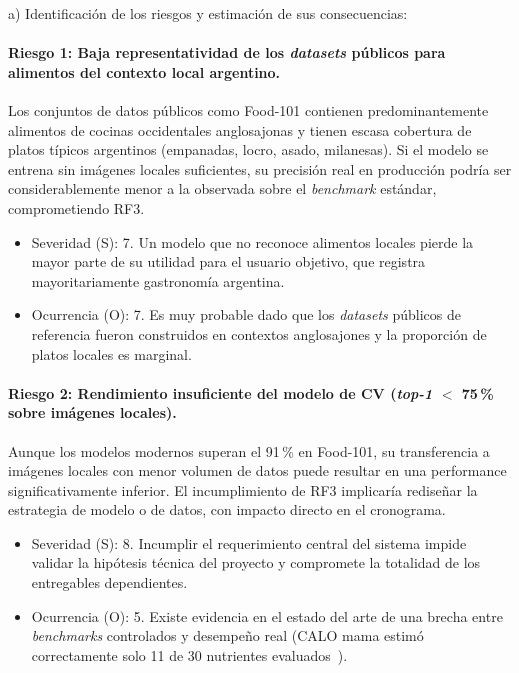 \documentclass[
11pt, %
]{charter}
\begin{document}
a) Identificación de los riesgos y estimación de sus consecuencias:

\paragraph{Riesgo 1: Baja representatividad de los \textit{datasets} públicos para alimentos del contexto local argentino.}
Los conjuntos de datos públicos como Food-101 contienen predominantemente alimentos de cocinas occidentales anglosajonas y tienen escasa cobertura de platos típicos argentinos (empanadas, locro, asado, milanesas). Si el modelo se entrena sin imágenes locales suficientes, su precisión real en producción podría ser considerablemente menor a la observada sobre el \textit{benchmark} estándar, comprometiendo RF3.
\begin{itemize}
	\item Severidad (S): 7. Un modelo que no reconoce alimentos locales pierde la mayor parte de su utilidad para el usuario objetivo, que registra mayoritariamente gastronomía argentina.
	\item Ocurrencia (O): 7. Es muy probable dado que los \textit{datasets} públicos de referencia fueron construidos en contextos anglosajones y la proporción de platos locales es marginal.
\end{itemize}

\paragraph{Riesgo 2: Rendimiento insuficiente del modelo de CV (\textit{top-1} $<$ 75\,\% sobre imágenes locales).}
Aunque los modelos modernos superan el 91\,\% en Food-101, su transferencia a imágenes locales con menor volumen de datos puede resultar en una performance significativamente inferior. El incumplimiento de RF3 implicaría rediseñar la estrategia de modelo o de datos, con impacto directo en el cronograma.
\begin{itemize}
	\item Severidad (S): 8. Incumplir el requerimiento central del sistema impide validar la hipótesis técnica del proyecto y compromete la totalidad de los entregables dependientes.
	\item Ocurrencia (O): 5. Existe evidencia en el estado del arte de una brecha entre \textit{benchmarks} controlados y desempeño real (CALO mama estimó correctamente solo 11 de 30 nutrientes evaluados~\cite{nakamura2022calomama}).
\end{itemize}
\end{document}
